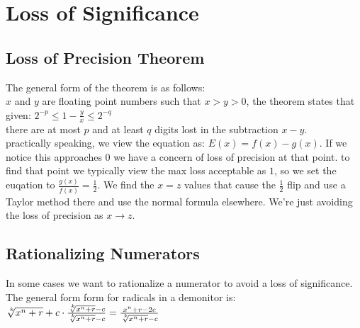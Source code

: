 \section{Loss of Significance}


\subsection*{Loss of Precision Theorem}
The general form of the theorem is as follows:\\
$x$ and $y$ are floating point numbers such that $x > y > 0$,
the theorem states that given:
$ 2^{-p} \leq 1 - \frac{y}{x} \leq 2^{-q} $\\
there are at most $p$ and at least $q$ digits lost in the subtraction $x-y$.\\

practically speaking, we view the equation as: $E(x) = f(x) - g(x)$. If
we notice this approaches $0$ we have a concern of loss of precision at that point.
to find that point we typically view the max loss acceptable as $1$, so we set
the euqation to $\frac{g(x)}{f(x)} = \frac{1}{2}$. We find the $x = z$ values that cause
the $\frac{1}{2}$ flip and use a Taylor method there and use the normal formula elsewhere.
We're just avoiding the loss of precision as $x \rightarrow z$.

\subsection*{Rationalizing Numerators}
In some cases we want to rationalize a numerator to avoid a loss of significance.
The general form form for radicals in a demonitor is:\\
$\sqrt[\leftroot{-2}\uproot{2}k]{x^n + r} + c  \cdot \frac{\sqrt[\leftroot{-2}\uproot{2}k]{x^n + r} - c}{\sqrt[\leftroot{-2}\uproot{2}k]{x^n + r} - c}   =  \frac{x^n + r -2c}{\sqrt[\leftroot{-2}\uproot{2}k]{x^n + r} - c}$\\
